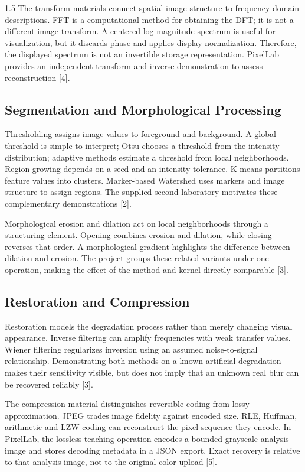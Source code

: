 \begin{spacing}{1.5}
The transform materials connect spatial image structure to frequency-domain descriptions. FFT is a computational method for obtaining the DFT; it is not a different image transform. A centered log-magnitude spectrum is useful for visualization, but it discards phase and applies display normalization. Therefore, the displayed spectrum is not an invertible storage representation. PixelLab provides an independent transform-and-inverse demonstration to assess reconstruction [4].

\subsection{Segmentation and Morphological Processing}
Thresholding assigns image values to foreground and background. A global threshold is simple to interpret; Otsu chooses a threshold from the intensity distribution; adaptive methods estimate a threshold from local neighborhoods. Region growing depends on a seed and an intensity tolerance. K-means partitions feature values into clusters. Marker-based Watershed uses markers and image structure to assign regions. The supplied second laboratory motivates these complementary demonstrations [2].

Morphological erosion and dilation act on local neighborhoods through a structuring element. Opening combines erosion and dilation, while closing reverses that order. A morphological gradient highlights the difference between dilation and erosion. The project groups these related variants under one operation, making the effect of the method and kernel directly comparable [3].

\subsection{Restoration and Compression}
Restoration models the degradation process rather than merely changing visual appearance. Inverse filtering can amplify frequencies with weak transfer values. Wiener filtering regularizes inversion using an assumed noise-to-signal relationship. Demonstrating both methods on a known artificial degradation makes their sensitivity visible, but does not imply that an unknown real blur can be recovered reliably [3].

The compression material distinguishes reversible coding from lossy approximation. JPEG trades image fidelity against encoded size. RLE, Huffman, arithmetic and LZW coding can reconstruct the pixel sequence they encode. In PixelLab, the lossless teaching operation encodes a bounded grayscale analysis image and stores decoding metadata in a JSON export. Exact recovery is relative to that analysis image, not to the original color upload [5].


\end{spacing}
